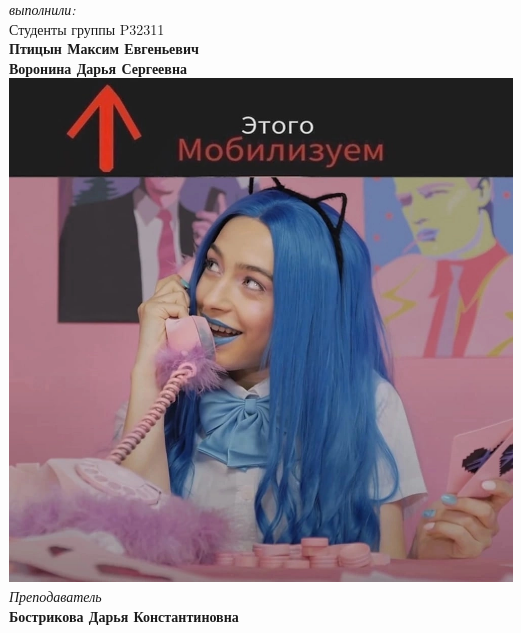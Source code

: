 \begin{flushright}
	\vspace{3cm}
	\textit{выполнили:}\\
	Студенты группы P32311\\
	\textbf{Птицын Максим Евгеньевич}\\
	\textbf{Воронина Дарья Сергеевна}\\
	\includegraphics[scale=0.07]{img/mobilize}\\
	\textit{Преподаватель}\\
	\textbf{Бострикова Дарья Константиновна}
\end{flushright}
\thispagestyle{empty}
\newpage